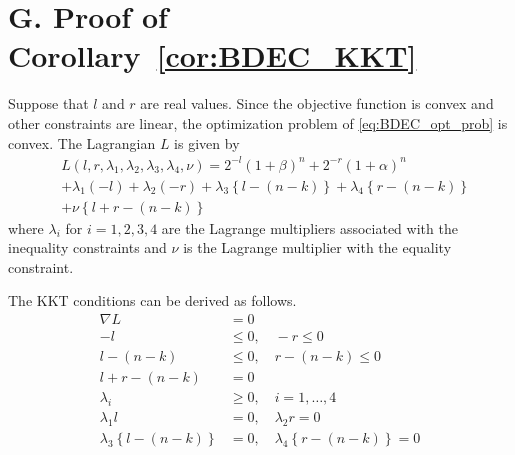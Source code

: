 \documentclass[10pt,twocolumn,twoside,submit]{JCNtran}
\begin{document}
\section*{G. Proof of Corollary~\ref{cor:BDEC_KKT}\label{pf:BDEC_KKT}}
	Suppose that $l$ and $r$ are real values. Since the objective function is convex and other constraints are linear, the optimization problem of \eqref{eq:BDEC_opt_prob} is convex. The Lagrangian $L$ is given by
	\begin{align}
	&L\left( l, r, \lambda_1, \lambda_2, \lambda_3, \lambda_4, \nu \right) = 2^{-l} \left(1 + \beta \right)^n + 2^{-r} \left( 1 + \alpha \right)^n \nonumber \\
	& + \lambda_1 (-l) + \lambda_2 (-r) + \lambda_3 \left\{l - (n - k)\right\} + \lambda_4 \left\{r - (n - k)\right\}  \nonumber \\
	& + \nu \left\{ l + r - (n - k) \right\}
	\end{align}
	where $\lambda_i$ for $i = 1, 2, 3, 4$ are the Lagrange multipliers associated with the inequality constraints and $\nu$ is the Lagrange multiplier with the equality constraint. 
	
	The KKT conditions can be derived as follows.	
	\begin{align}
	\nabla L & = 0 \label{eq:appendix_KKT_gradient_expand}\\
	-l & \le 0, \quad -r \le 0 \\
	l - (n - k) & \le 0,\quad r - (n - k) \le 0 \\
	l + r - (n - k ) & = 0 \label{eq:appendix_KKT_equality} \\
	\lambda_i & \ge 0, \quad i = 1,\ldots, 4 \\
	\lambda_1 l & = 0, \quad \lambda_2 r = 0 \\
	\lambda_3 \left\{ l - (n - k) \right\} & = 0, \quad \lambda_4 \left\{ r - (n - k) \right\} = 0
	\end{align}
		
	
	
\end{document}
